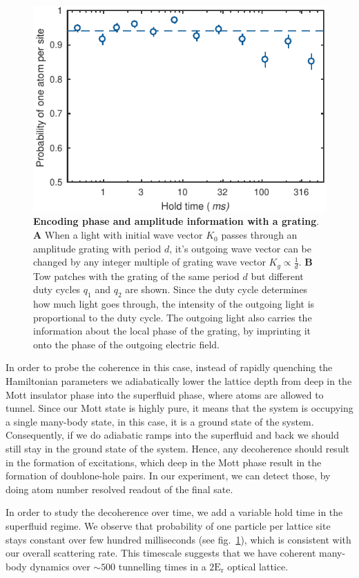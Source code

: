 \begin{figure}[t]
	\centering
	\includegraphics[scale=1]{figures/CBH_melt_and_back_p1.pdf}
	\caption{{\bf Encoding phase and amplitude information with a grating}. {\bf A} When a light with initial wave vector $K_0$ passes through an amplitude grating with period $d$, it's outgoing wave vector can be changed by any integer multiple of grating wave vector $K_g\propto \frac{1}{d}$. {\bf B} Tow patches with the grating of the same period $d$ but different duty cycles $q_1$ and $q_2$ are shown. Since the duty cycle determines how much light goes through, the intensity of the outgoing light is proportional to the duty cycle. The outgoing light also carries the information about the local phase of the grating, by imprinting it onto the phase of the outgoing electric field.}
	\label{fig:CBH_melt_and_back}
\end{figure}

In order to probe the coherence in this case, instead of rapidly quenching the Hamiltonian parameters we adiabatically lower the lattice depth from deep in the Mott insulator phase into the superfluid phase, where atoms are allowed to tunnel. Since our Mott state is highly pure, it means that the system is occupying a single many-body state, in this case, it is a ground state of the system. Consequently, if we do adiabatic ramps into the superfluid and back we should still stay in the ground state of the system. Hence, any decoherence should result in the formation of excitations, which deep in the Mott phase result in the formation of doublone-hole pairs. In our experiment, we can detect those, by doing atom number resolved readout of the final sate.

In order to study the decoherence over time, we add a variable hold time in the superfluid regime. We observe that probability of one particle per lattice site stays constant over few hundred milliseconds (see fig.~\ref{fig:CBH_melt_and_back}), which is consistent with our overall scattering rate. This timescale suggests that we have coherent many-body dynamics over $\sim 500$ tunnelling times in a $2\mathrm{E_r}$ optical lattice.